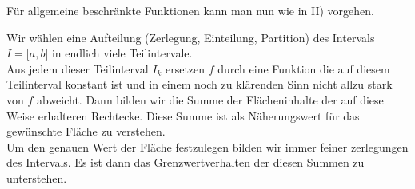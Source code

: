 \begin{enumerate}[I)]
\begin{center}
\begin{tikzpicture}
\end{tikzpicture}
\end{center}

Für allgemeine beschränkte Funktionen kann man nun wie in II) vorgehen.

\begin{center}
\end{center}

Wir wählen eine Aufteilung (Zerlegung, Einteilung, Partition) des Intervals $I=\lbrack a,b\rbrack$ in endlich viele Teilintervale. \\

Aus jedem dieser Teilinterval $I_k$ ersetzen $f$ durch eine Funktion die auf diesem Teilinterval konstant ist und in einem noch zu klärenden Sinn nicht allzu stark von $f$ abweicht. Dann bilden wir die Summe der Flächeninhalte der auf diese Weise erhalteren Rechtecke. Diese Summe ist als Näherungswert für das gewünschte Fläche zu verstehen. \\

Um den genauen Wert der Fläche festzulegen bilden wir immer feiner zerlegungen des Intervals. Es ist dann das Grenzwertverhalten der diesen Summen zu unterstehen. 
\end{enumerate}
